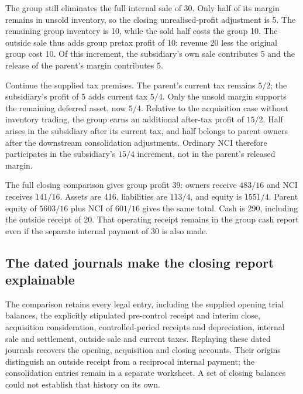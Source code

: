 The group still eliminates the full internal sale of 30. Only half of its
margin remains in unsold inventory, so the closing unrealised-profit
adjustment is 5. The remaining group inventory is 10, while the sold half
costs the group 10. The outside sale thus adds group pretax profit of 10:
revenue 20 less the original group cost 10. Of this increment, the
subsidiary's own sale contributes 5 and the release of the parent's margin
contributes 5.

Continue the supplied tax premises. The parent's current tax remains $5/2$;
the subsidiary's profit of 5 adds current tax $5/4$. Only the unsold margin
supports the remaining deferred asset, now $5/4$. Relative to the acquisition
case without inventory trading, the group earns an additional after-tax
profit of $15/2$. Half arises in the subsidiary after its current tax, and
half belongs to parent owners after the downstream consolidation adjustments.
Ordinary NCI therefore participates in the subsidiary's $15/4$ increment,
not in the parent's released margin.

The full closing comparison gives group profit 39: owners receive $483/16$
and NCI receives $141/16$. Assets are 416, liabilities are $113/4$, and equity
is $1551/4$. Parent equity of $5603/16$ plus NCI of $601/16$ gives the same
total. Cash is 290, including the outside receipt of 20. That operating receipt
remains in the group cash report even if the separate internal payment of 30
is also made.

\subsection{The dated journals make the closing report explainable}

The comparison retains every legal entry, including the supplied opening
trial balances, the explicitly stipulated pre-control receipt and interim
close, acquisition consideration, controlled-period receipts and depreciation,
internal sale and settlement, outside sale and current taxes. Replaying these
dated journals recovers the opening, acquisition and closing accounts. Their
origins distinguish an outside receipt from a reciprocal internal payment;
the consolidation entries remain in a separate worksheet. A set of closing
balances could not establish that history on its own.

